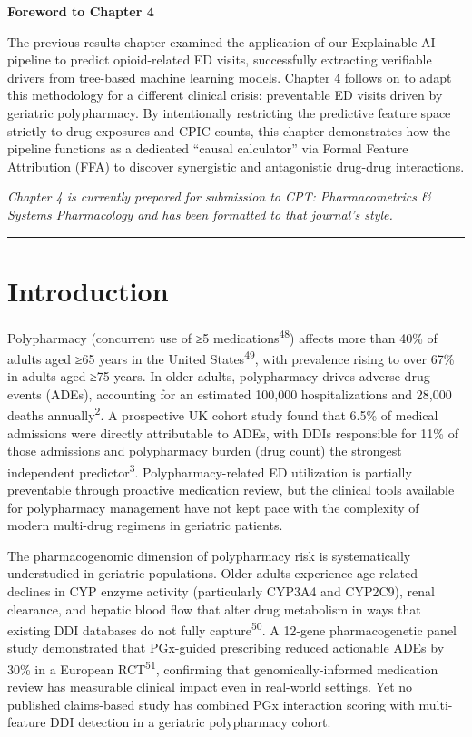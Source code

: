 \documentclass[
  12pt,
]{book}
\begin{document}
\textbf{Foreword to Chapter 4}

The previous results chapter examined the application of our Explainable
AI pipeline to predict opioid-related ED visits, successfully extracting
verifiable drivers from tree-based machine learning models. Chapter 4
follows on to adapt this methodology for a different clinical crisis:
preventable ED visits driven by geriatric polypharmacy. By intentionally
restricting the predictive feature space strictly to drug exposures and
CPIC counts, this chapter demonstrates how the pipeline functions as a
dedicated ``causal calculator'' via Formal Feature Attribution (FFA) to
discover synergistic and antagonistic drug-drug interactions.

\emph{Chapter 4 is currently prepared for submission to CPT:
Pharmacometrics \& Systems Pharmacology and has been formatted to that
journal's style.}

\begin{center}\rule{0.5\linewidth}{0.5pt}\end{center}

\chapter{Introduction}\label{sec-intro}

Polypharmacy (concurrent use of ≥5 medications\textsuperscript{48})
affects more than 40\% of adults aged ≥65 years in the United
States\textsuperscript{49}, with prevalence rising to over 67\% in
adults aged ≥75 years. In older adults, polypharmacy drives adverse drug
events (ADEs), accounting for an estimated 100,000 hospitalizations and
28,000 deaths annually\textsuperscript{2}. A prospective UK cohort study
found that 6.5\% of medical admissions were directly attributable to
ADEs, with DDIs responsible for 11\% of those admissions and
polypharmacy burden (drug count) the strongest independent
predictor\textsuperscript{3}. Polypharmacy-related ED utilization is
partially preventable through proactive medication review, but the
clinical tools available for polypharmacy management have not kept pace
with the complexity of modern multi-drug regimens in geriatric patients.

The pharmacogenomic dimension of polypharmacy risk is systematically
understudied in geriatric populations. Older adults experience
age-related declines in CYP enzyme activity (particularly CYP3A4 and
CYP2C9), renal clearance, and hepatic blood flow that alter drug
metabolism in ways that existing DDI databases do not fully
capture\textsuperscript{50}. A 12-gene pharmacogenetic panel study
demonstrated that PGx-guided prescribing reduced actionable ADEs by 30\%
in a European RCT\textsuperscript{51}, confirming that
genomically-informed medication review has measurable clinical impact
even in real-world settings. Yet no published claims-based study has
combined PGx interaction scoring with multi-feature DDI detection in a
geriatric polypharmacy cohort.
\end{document}
